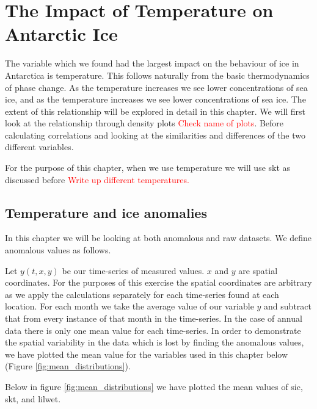 \documentclass[../main.tex]{subfiles}
\begin{document}
\chapter[Temperature and Ice]{The Impact of Temperature on Antarctic Ice}

The variable which we found had the largest impact on the behaviour of ice in Antarctica is temperature. This follows naturally from the basic thermodynamics of phase change. As the temperature increases we see lower concentrations of sea ice, and as the temperature increases we see lower concentrations of sea ice. The extent of this relationship will be explored in detail in this chapter. We will first look at the relationship through density plots \textcolor{red}{Check name of plots}. Before calculating correlations and looking at the similarities and differences of the two different variables.

For the purpose of this chapter, when we use temperature we will use \gls{skt} as discussed before \textcolor{red}{Write up different temperatures.}

\section{Temperature and ice anomalies}
In this chapter we will be looking at both anomalous and raw datasets. We define anomalous values as follows.

Let $y(t,x,y)$ be our time-series of measured values. $x$ and $y$ are spatial coordinates. For the purposes of this exercise the spatial coordinates are arbitrary as we apply the calculations separately for each time-series found at each location. For each month we take the average value of our variable $y$ and subtract that from every instance of that month in the time-series. In the case of annual data there is only one mean value for each time-series. In order to demonstrate the spatial variability in the data which is lost by finding the anomalous values, we have plotted the mean value for the variables used in this chapter below (Figure \ref{fig:mean_distributions}).

Below in figure \ref{fig:mean_distributions} we have plotted the mean values of \gls{sic}, \gls{skt}, and \gls{lilwet}.
\end{document}
